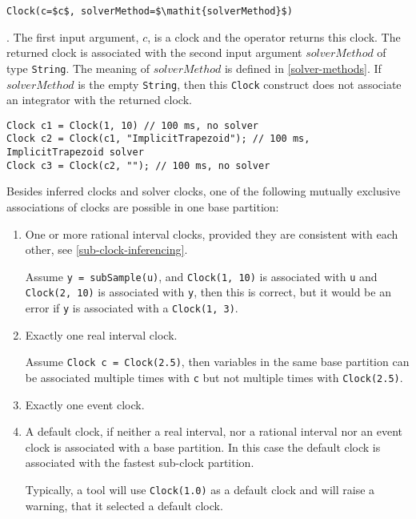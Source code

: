 \begin{operatordefinition*}[Clock]\label{modelica:clock-solver}
\begin{synopsis}\begin{lstlisting}
Clock(c=$c$, solverMethod=$\mathit{solverMethod}$)
\end{lstlisting}\end{synopsis}
\begin{semantics}
.  The first input argument, $c$, is a clock and the operator returns this clock.  The returned clock is associated with the second input argument $\mathit{solverMethod}$ of type \lstinline!String!.  The meaning of $\mathit{solverMethod}$ is defined in \cref{solver-methods}.  If $\mathit{solverMethod}$ is the empty \lstinline!String!, then this \lstinline!Clock! construct does not associate an integrator with the returned clock.

\begin{example}
\begin{lstlisting}[language=modelica]
Clock c1 = Clock(1, 10) // 100 ms, no solver
Clock c2 = Clock(c1, "ImplicitTrapezoid"); // 100 ms, ImplicitTrapezoid solver
Clock c3 = Clock(c2, ""); // 100 ms, no solver
\end{lstlisting}
\end{example}
\end{semantics}
\end{operatordefinition*}

Besides inferred clocks and solver clocks, one of the following mutually
exclusive associations of clocks are possible in one base partition:
\begin{enumerate}
\item
  One or more rational interval clocks, provided they are consistent with each other, see \cref{sub-clock-inferencing}.
  \begin{example}
  Assume \lstinline!y = subSample(u)!, and \lstinline!Clock(1, 10)! is associated with \lstinline!u! and \lstinline!Clock(2, 10)! is associated with \lstinline!y!, then this is correct, but it would be an error if \lstinline!y! is associated with a \lstinline!Clock(1, 3)!.
  \end{example}
\item
  Exactly one real interval clock.
  \begin{example}
  Assume \lstinline!Clock c = Clock(2.5)!, then variables in the same base partition can be associated multiple times with \lstinline!c! but not multiple times with \lstinline!Clock(2.5)!.
  \end{example}
\item
  Exactly one event clock.
\item
  A default clock, if neither a real interval, nor a rational interval nor an event clock is associated with a base partition.  In this case the default clock is associated with the fastest sub-clock partition.
  \begin{nonnormative}
  Typically, a tool will use \lstinline!Clock(1.0)! as a default clock and will raise a warning, that it selected a default clock.
  \end{nonnormative}
\end{enumerate}

